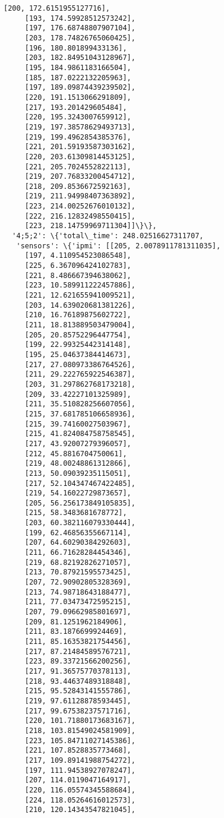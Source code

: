 \documentclass[11pt]{article}
\begin{document}
\begin{tcolorbox}[breakable, size=fbox, boxrule=.5pt, pad at break*=1mm, opacityfill=0]
\begin{Verbatim}[commandchars=\\\{\}]
     [200, 172.6151955127716],
     [193, 174.59928512573242],
     [197, 176.68748807907104],
     [203, 178.74826765060425],
     [196, 180.801899433136],
     [203, 182.84951043128967],
     [195, 184.9861183166504],
     [185, 187.0222132205963],
     [197, 189.09874439239502],
     [220, 191.1513066291809],
     [217, 193.201429605484],
     [220, 195.3243007659912],
     [219, 197.38578629493713],
     [219, 199.4962854385376],
     [221, 201.59193587303162],
     [220, 203.61309814453125],
     [221, 205.7024552822113],
     [219, 207.76833200454712],
     [218, 209.8536672592163],
     [219, 211.94998407363892],
     [223, 214.00252676010132],
     [222, 216.12832498550415],
     [223, 218.14759969711304]]\}\},
  '4;5;2': \{'total\_time': 248.02516627311707,
   'sensors': \{'ipmi': [[205, 2.0078911781311035],
     [197, 4.110954523086548],
     [225, 6.367096424102783],
     [221, 8.486667394638062],
     [223, 10.589911222457886],
     [221, 12.621655941009521],
     [203, 14.639020681381226],
     [210, 16.76189875602722],
     [211, 18.813889503479004],
     [205, 20.85752296447754],
     [199, 22.99325442314148],
     [195, 25.04637384414673],
     [217, 27.080973386764526],
     [211, 29.222765922546387],
     [203, 31.297862768173218],
     [209, 33.42227101325989],
     [211, 35.510828256607056],
     [215, 37.681785106658936],
     [215, 39.74160027503967],
     [215, 41.824084758758545],
     [217, 43.92007279396057],
     [212, 45.8816704750061],
     [219, 48.00248861312866],
     [213, 50.09039235115051],
     [217, 52.104347467422485],
     [219, 54.16022729873657],
     [205, 56.256173849105835],
     [215, 58.3483681678772],
     [203, 60.382116079330444],
     [199, 62.46856355667114],
     [207, 64.60290384292603],
     [211, 66.71628284454346],
     [219, 68.82192826271057],
     [213, 70.87921595573425],
     [207, 72.90902805328369],
     [213, 74.98718643188477],
     [211, 77.03473472595215],
     [207, 79.09662985801697],
     [209, 81.1251962184906],
     [211, 83.1876699924469],
     [211, 85.16353821754456],
     [217, 87.21484589576721],
     [223, 89.33721566200256],
     [217, 91.36575770378113],
     [218, 93.44637489318848],
     [215, 95.52843141555786],
     [219, 97.61128878593445],
     [217, 99.67538237571716],
     [220, 101.71880173683167],
     [218, 103.81549024581909],
     [223, 105.84711027145386],
     [221, 107.8528835773468],
     [217, 109.89141988754272],
     [197, 111.94538927078247],
     [207, 114.0119047164917],
     [220, 116.05574345588684],
     [224, 118.05264616012573],
     [210, 120.14343547821045],

\end{Verbatim}
\end{tcolorbox}
\end{document}
